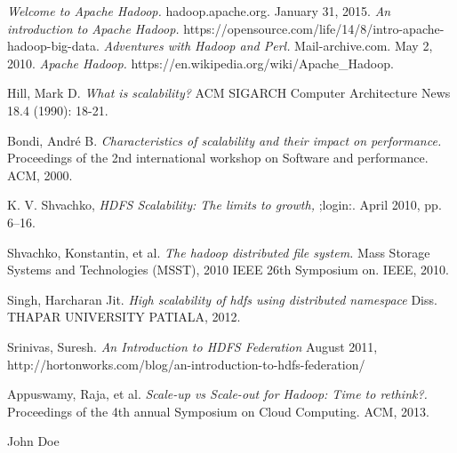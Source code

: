 \documentclass[conference]{IEEEtran}
\begin{document}
\begin{thebibliography}{1}

        \emph{Welcome to Apache Hadoop.}
        hadoop.apache.org.
        January 31, 2015.
        \emph{An introduction to Apache Hadoop.}
        https://opensource.com/life/14/8/intro-apache-hadoop-big-data.
        \emph{Adventures with Hadoop and Perl.}
        Mail-archive.com.
        May 2, 2010.
        \emph{Apache Hadoop.}
        https://en.wikipedia.org/wiki/Apache\_Hadoop.


    Hill, Mark D. \emph{What is scalability?} 
    ACM SIGARCH Computer Architecture News 18.4 (1990): 18-21.

    Bondi, André B. \emph{Characteristics of scalability and their impact on performance.}
    Proceedings of the 2nd international workshop on Software and performance. ACM,
    2000.

    K. V. Shvachko, \emph{HDFS Scalability: The limits to growth,} 
    ;login:. April 2010, pp. 6–16.

    Shvachko, Konstantin, et al. \emph{The hadoop distributed file system.} 
    Mass Storage Systems and Technologies (MSST), 2010 IEEE 26th Symposium on. IEEE, 2010.

    Singh, Harcharan Jit. 
    \emph{High scalability of hdfs using distributed namespace} 
    Diss. THAPAR UNIVERSITY PATIALA, 2012.

    Srinivas, Suresh.
    \emph{An Introduction to HDFS Federation}
    August 2011,
    http://hortonworks.com/blog/an-introduction-to-hdfs-federation/

        Appuswamy, Raja, et al. \emph{Scale-up vs Scale-out for Hadoop: Time to rethink?.} 
        Proceedings of the 4th annual Symposium on Cloud Computing. ACM, 2013.

\end{thebibliography}


\begin{IEEEbiography}{John Doe}
\blindtext
\end{IEEEbiography}
\end{document}
